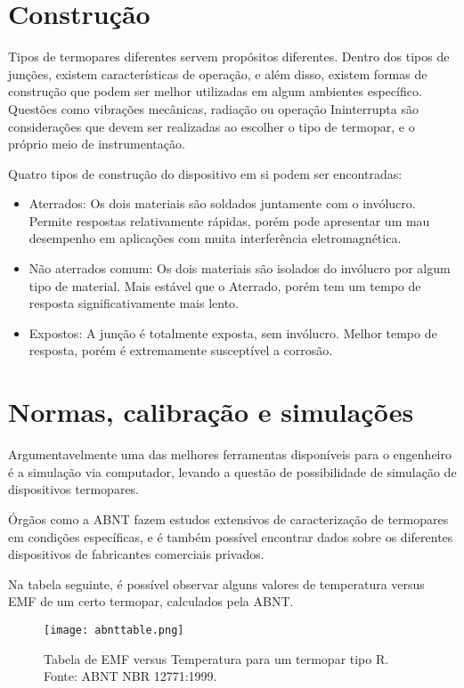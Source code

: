 \documentclass[a4paper,12pt]{report}
\begin{document}
	\section{Construção}
	
	Tipos de termopares diferentes servem propósitos diferentes. Dentro dos tipos de junções, existem características de operação, e além disso, existem formas de construção que podem ser melhor utilizadas em algum ambientes específico. Questões como vibrações mecânicas, radiação ou operação Ininterrupta são considerações que devem ser realizadas ao escolher o tipo de termopar, e o próprio meio de instrumentação.
	
	Quatro tipos de construção do dispositivo em si podem ser encontradas:
	
	\begin{itemize}
		\item Aterrados: Os dois materiais são soldados juntamente com o invólucro. Permite respostas relativamente rápidas, porém pode apresentar um mau desempenho em aplicações com muita interferência eletromagnética.
		
		\item Não aterrados comum: Os dois materiais são isolados do invólucro por algum tipo de material. Mais estável que o Aterrado, porém tem um tempo de resposta significativamente mais lento.
		
		\item Expostos: A junção é totalmente exposta, sem invólucro. Melhor tempo de resposta, porém é extremamente susceptível a corrosão.
	\end{itemize}

	\section{Normas, calibração e simulações}
	Argumentavelmente uma das melhores ferramentas disponíveis para o engenheiro é a simulação via computador, levando a questão de possibilidade de simulação de dispositivos termopares.
	
	Órgãos como a ABNT fazem estudos extensivos de caracterização de termopares em condições específicas, e é também possível encontrar dados sobre os diferentes dispositivos de fabricantes comerciais privados.
	
	Na tabela seguinte, é possível observar alguns valores de temperatura versus EMF de um certo termopar, calculados pela ABNT.
	
	\begin{figure}[H]
		\centering
		\texttt{[image: abnttable.png]}\\
		\caption{Tabela de EMF versus Temperatura para um termopar tipo R. Fonte: ABNT NBR 12771:1999.}
	\end{figure}
\end{document}
